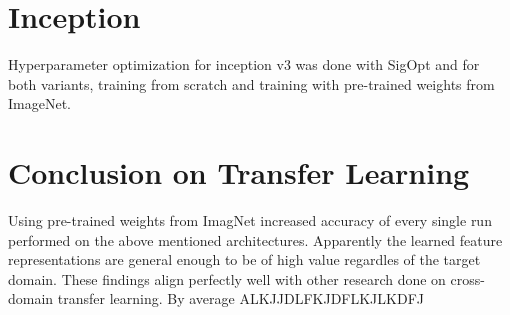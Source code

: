








\section{Inception}


Hyperparameter optimization for inception v3 was done with SigOpt and for both variants, training from scratch and training with pre-trained weights from ImageNet.

\begin{table}[h] \centering
{}
\caption{Hyper parameters for inception v3 optimized with SigOpt. First row shows hyperparameters training the architecture from scratch. Second row used pre-trained weights from ImageNet}
\label{tbl:Inceptionv3}
\end{table}

\section{Conclusion on Transfer Learning}

Using pre-trained weights from ImagNet increased accuracy of every single run performed on the above mentioned architectures. Apparently the learned feature representations are general enough to be of high  value regardles of the target domain. These findings align perfectly well with other research done on cross-domain transfer learning. By average ALKJJDLFKJDFLKJLKDFJ


